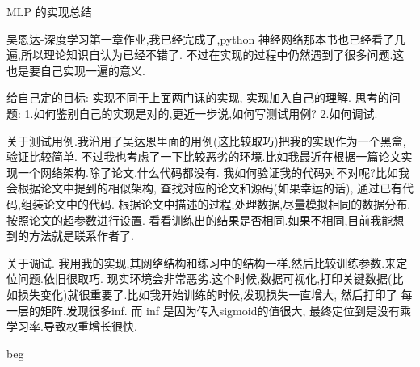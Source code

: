 MLP 的实现总结

吴恩达-深度学习第一章作业,我已经完成了,python 神经网络那本书也已经看了几遍,所以理论知识自认为已经不错了.
不过在实现的过程中仍然遇到了很多问题.这也是要自己实现一遍的意义.

给自己定的目标: 实现不同于上面两门课的实现, 实现加入自己的理解.
思考的问题:
1.如何鉴别自己的实现是对的,更近一步说,如何写测试用例?
2.如何调试. 

关于测试用例.我沿用了吴达恩里面的用例(这比较取巧)把我的实现作为一个黑盒,验证比较简单.
不过我也考虑了一下比较恶劣的环境.比如我最近在根据一篇论文实现一个网络架构.除了论文,什么代码都没有.
我如何验证我的代码对不对呢?比如我会根据论文中提到的相似架构, 查找对应的论文和源码(如果幸运的话),
通过已有代码,组装论文中的代码. 根据论文中描述的过程,处理数据,尽量模拟相同的数据分布. 按照论文的超参数进行设置.
看看训练出的结果是否相同.如果不相同,目前我能想到的方法就是联系作者了.

关于调试. 我用我的实现,其网络结构和练习中的结构一样.然后比较训练参数.来定位问题.依旧很取巧.
现实环境会非常恶劣.这个时候,数据可视化,打印关键数据(比如损失变化)就很重要了.比如我开始训练的时候,发现损失一直增大,
然后打印了 每一层的矩阵.发现很多inf. 而 inf 是因为传入sigmoid的值很大, 最终定位到是没有乘学习率.导致权重增长很快.

beg

